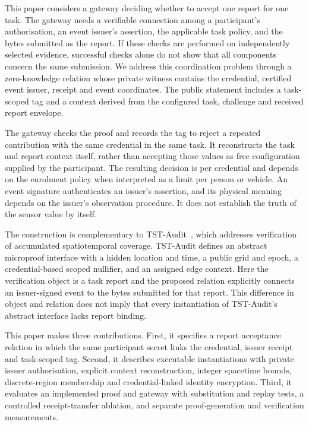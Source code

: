 \documentclass[pdflatex,iicol,sn-mathphys-num]{sn-jnl}
\begin{document}
This paper considers a gateway deciding whether to accept one report for one task. The gateway needs a verifiable connection among a participant's authorisation, an event issuer's assertion, the applicable task policy, and the bytes submitted as the report. If these checks are performed on independently selected evidence, successful checks alone do not show that all components concern the same submission. We address this coordination problem through a zero-knowledge relation whose private witness contains the credential, certified event issuer, receipt and event coordinates. The public statement includes a task-scoped tag and a context derived from the configured task, challenge and received report envelope.

The gateway checks the proof and records the tag to reject a repeated contribution with the same credential in the same task. It reconstructs the task and report context itself, rather than accepting those values as free configuration supplied by the participant. The resulting decision is per credential and depends on the enrolment policy when interpreted as a limit per person or vehicle. An event signature authenticates an issuer's assertion, and its physical meaning depends on the issuer's observation procedure. It does not establish the truth of the sensor value by itself.

The construction is complementary to TST-Audit~\citep{He2026TSTAudit}, which addresses verification of accumulated spatiotemporal coverage. TST-Audit defines an abstract microproof interface with a hidden location and time, a public grid and epoch, a credential-based scoped nullifier, and an assigned edge context. Here the verification object is a task report and the proposed relation explicitly connects an issuer-signed event to the bytes submitted for that report. This difference in object and relation does not imply that every instantiation of TST-Audit's abstract interface lacks report binding.

This paper makes three contributions. First, it specifies a report acceptance relation in which the same participant secret links the credential, issuer receipt and task-scoped tag. Second, it describes executable instantiations with private issuer authorisation, explicit context reconstruction, integer spacetime bounds, discrete-region membership and credential-linked identity encryption. Third, it evaluates an implemented proof and gateway with substitution and replay tests, a controlled receipt-transfer ablation, and separate proof-generation and verification measurements.
\end{document}
